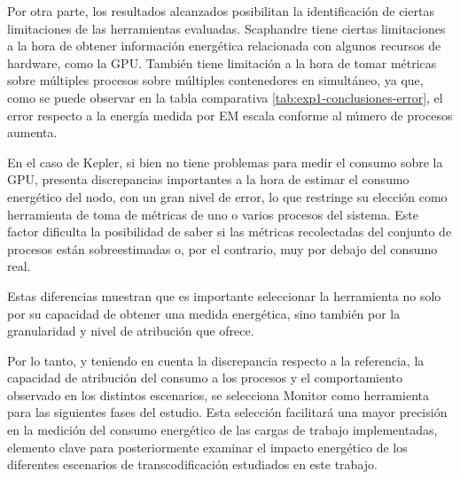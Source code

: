 Por otra parte, los resultados alcanzados posibilitan la identificación de ciertas limitaciones de las herramientas evaluadas. Scaphandre tiene ciertas limitaciones a la hora de obtener información energética relacionada con algunos recursos de hardware, como la GPU. También tiene limitación a la hora de tomar métricas sobre múltiples procesos sobre múltiples contenedores en simultáneo, ya que, como se puede observar en la tabla comparativa \ref{tab:exp1-conclusiones-error}, el error respecto a la energía medida por EM escala conforme al número de procesos aumenta.  

En el caso de Kepler, si bien no tiene problemas para medir el consumo sobre la GPU, presenta discrepancias importantes a la hora de estimar el consumo energético del nodo, con un gran nivel de error, lo que restringe su elección como herramienta de toma de métricas de uno o varios procesos del sistema. Este factor dificulta la posibilidad de saber si las métricas recolectadas del conjunto de procesos están sobreestimadas o, por el contrario, muy por debajo del consumo real.

Estas diferencias muestran que es importante seleccionar la herramienta no solo por su capacidad de obtener una medida energética, sino también por la granularidad y nivel de atribución que ofrece.

Por lo tanto, y teniendo en cuenta la discrepancia respecto a la referencia, la capacidad de atribución del consumo a los procesos y el comportamiento observado en los distintos escenarios, se selecciona Monitor como herramienta para las siguientes fases del estudio. Esta selección facilitará una mayor precisión en la medición del consumo energético de las cargas de trabajo implementadas, elemento clave para posteriormente examinar el impacto energético de los diferentes escenarios de transcodificación estudiados en este trabajo.

